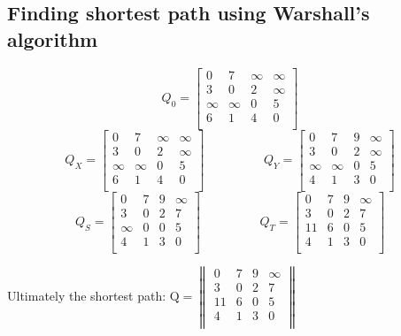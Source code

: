 \subsection{Finding shortest path using Warshall's algorithm}
$$
Q_0=
\begin{bmatrix}
	0 & 7 & \infty & \infty \\
	3 & 0 & 2 & \infty \\
	\infty & \infty & 0 & 5 \\
	6 & 1 & 4 & 0 \\
\end{bmatrix}
$$
\vspace{0.5cm}
$$
Q_X=
\begin{bmatrix}
0 & 7 & \infty & \infty \\
3 & 0 & 2 & \infty \\
\infty & \infty & 0 & 5 \\
6 & 1 & 4 & 0 \\
\end{bmatrix}
\hspace{2cm}
Q_Y=
\begin{bmatrix}
0 & 7 & 9 & \infty \\
3 & 0 & 2 & \infty \\
\infty & \infty & 0 & 5 \\
4 & 1 & 3 & 0 \\
\end{bmatrix}
$$
\vspace{0.5cm}
$$
Q_S=
\begin{bmatrix}
0 & 7 & 9 & \infty \\
3 & 0 & 2 & 7 \\
\infty & 0 & 0 & 5 \\
4 & 1 & 3 & 0 \\
\end{bmatrix}
\hspace{2cm}
Q_T=
\begin{bmatrix}
0 & 7 & 9 & \infty \\
3 & 0 & 2 & 7 \\
11 & 6 & 0 & 5 \\
4 & 1 & 3 & 0 \\
\end{bmatrix}
$$

Ultimately the shortest path: 
$
\textrm{Q}=
\begin{Vmatrix}
0 & 7 & 9 & \infty \\
3 & 0 & 2 & 7 \\
11 & 6 & 0 & 5 \\
4 & 1 & 3 & 0 \\
\end{Vmatrix}
$